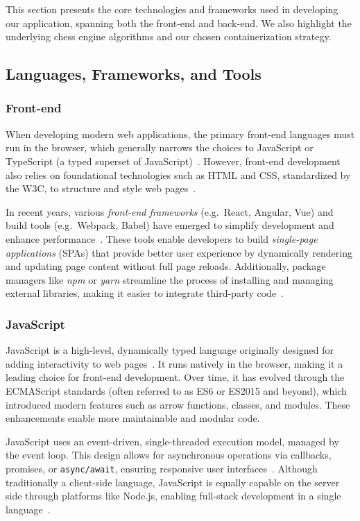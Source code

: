 \documentclass[12pt,a4paper]{article}
\begin{document}
This section presents the core technologies and frameworks used in developing our application, spanning both the front-end and back-end. We also highlight the underlying chess engine algorithms and our chosen containerization strategy. 

\subsection{Languages, Frameworks, and Tools}
\subsubsection{Front-end}
When developing modern web applications, the primary front-end languages must run
in the browser, which generally narrows the choices to JavaScript or TypeScript (a typed superset of JavaScript)~\cite{ECMA}. However, front-end development also relies on foundational technologies such as HTML and CSS, standardized by the W3C, to structure and style web pages~\cite{W3C,MDNDocs}. 

In recent years, various \emph{front-end frameworks} (e.g.\ React, Angular, Vue) and build tools (e.g.\ Webpack, Babel) have emerged to simplify development and enhance performance~\cite{webpack,babel}. These tools enable developers to build \emph{single-page applications} (SPAs) that provide better user experience by dynamically rendering and updating page content without full page reloads. Additionally, package managers like \emph{npm} or \emph{yarn} streamline the process of installing and managing external libraries, making it easier to integrate third-party code~\cite{npmDocs,yarnDocs}.

\subsubsection*{JavaScript}
JavaScript is a high-level, dynamically typed language originally designed for adding
interactivity to web pages~\cite{ECMA,JSHistory}. It runs natively in the browser, making it a leading choice for front-end development. Over time, it has evolved through the ECMAScript standards (often referred to as ES6 or ES2015 and beyond), which introduced modern features such as arrow functions, classes, and modules. These enhancements enable more maintainable and modular code.

JavaScript uses an event-driven, single-threaded execution model, managed by the event
loop. This design allows for asynchronous operations via callbacks, promises, or \texttt{async/await}, ensuring responsive user interfaces~\cite{KyleSimpsonAsyncJS}. Although traditionally a client-side language, JavaScript is equally capable on the server side through platforms like Node.js, enabling full-stack development in a single language~\cite{nodeDocs}.
\end{document}
